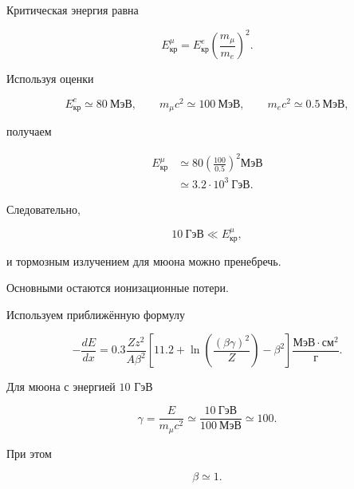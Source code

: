 \documentclass[../final.tex]{subfiles}
\begin{document}
Критическая энергия равна

\begin{equation*}
    E_{\text{кр}}^\mu
    =
    E_{\text{кр}}^e
    \left(
        \frac{m_\mu}{m_e}
    \right)^2.
\end{equation*}

Используя оценки

\begin{equation*}
    E_{\text{кр}}^e
    \simeq
    80\ \text{МэВ},
    \qquad
    m_\mu c^2
    \simeq
    100\ \text{МэВ},
    \qquad
    m_ec^2
    \simeq
    0.5\ \text{МэВ},
\end{equation*}

получаем

\begin{align*}
    E_{\text{кр}}^\mu
    &\simeq
    80
    \left(
        \frac{100}{0.5}
    \right)^2
    \text{МэВ}
    \\[3pt]
    &\simeq
    3.2\cdot10^3\ \text{ГэВ}.
\end{align*}

Следовательно,

\begin{equation*}
    10\ \text{ГэВ}
    \ll
    E_{\text{кр}}^\mu,
\end{equation*}

и тормозным излучением для мюона можно пренебречь.

Основными остаются ионизационные потери.

Используем приближённую формулу

\begin{equation*}
    -
    \frac{dE}{dx}
    =
    0.3
    \frac{
        Zz^2
    }{
        A\beta^2
    }
    \left[
        11.2
        +
        \ln
        \left(
            \frac{
                (\beta\gamma)^2
            }{
                Z
            }
        \right)
        -
        \beta^2
    \right]
    \frac{
        \text{МэВ}\cdot\text{см}^2
    }{
        \text{г}
    }.
\end{equation*}

Для мюона с энергией $10$ ГэВ

\begin{equation*}
    \gamma
    =
    \frac{E}{m_\mu c^2}
    \simeq
    \frac{10\ \text{ГэВ}}{100\ \text{МэВ}}
    \simeq
    100.
\end{equation*}

При этом

\begin{equation*}
    \beta\simeq1.
\end{equation*}
\end{document}
